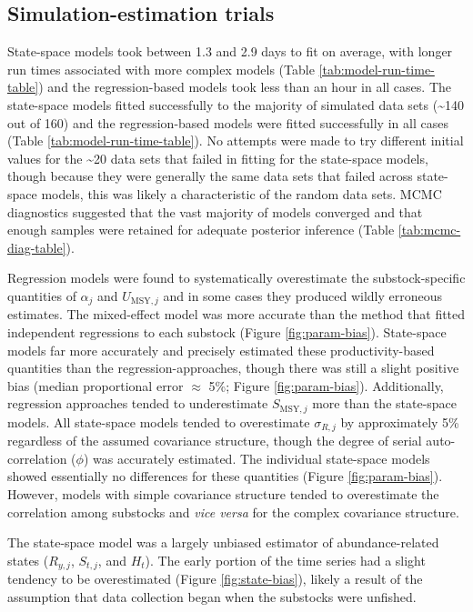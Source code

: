 \documentclass[12pt,]{book}
\theoremstyle{definition}
\theoremstyle{definition}
\theoremstyle{definition}
\theoremstyle{remark}
\begin{document}
\subsection{Simulation-estimation
trials}\label{simulation-estimation-trials-1}

\noindent
State-space models took between 1.3 and 2.9 days to fit on average, with
longer run times associated with more complex models (Table
\ref{tab:model-run-time-table}) and the regression-based models took
less than an hour in all cases. The state-space models fitted
successfully to the majority of simulated data sets
(\textasciitilde{}140 out of 160) and the regression-based models were
fitted successfully in all cases (Table \ref{tab:model-run-time-table}).
No attempts were made to try different initial values for the
\textasciitilde{}20 data sets that failed in fitting for the state-space
models, though because they were generally the same data sets that
failed across state-space models, this was likely a characteristic of
the random data sets. MCMC diagnostics suggested that the vast majority
of models converged and that enough samples were retained for adequate
posterior inference (Table \ref{tab:mcmc-diag-table}).

Regression models were found to systematically overestimate the
substock-specific quantities of \(\alpha_j\) and \(U_{\text{MSY},j}\)
and in some cases they produced wildly erroneous estimates. The
mixed-effect model was more accurate than the method that fitted
independent regressions to each substock (Figure \ref{fig:param-bias}).
State-space models far more accurately and precisely estimated these
productivity-based quantities than the regression-approaches, though
there was still a slight positive bias (median proportional error
\(\approx\) 5\%; Figure \ref{fig:param-bias}). Additionally, regression
approaches tended to underestimate \(S_{\text{MSY},j}\) more than the
state-space models. All state-space models tended to overestimate
\(\sigma_{R,j}\) by approximately 5\% regardless of the assumed
covariance structure, though the degree of serial auto-correlation
(\(\phi\)) was accurately estimated. The individual state-space models
showed essentially no differences for these quantities (Figure
\ref{fig:param-bias}). However, models with simple covariance structure
tended to overestimate the correlation among substocks and \emph{vice
versa} for the complex covariance structure.

The state-space model was a largely unbiased estimator of
abundance-related states (\(R_{y,j}\), \(S_{t,j}\), and \(H_t\)). The
early portion of the time series had a slight tendency to be
overestimated (Figure \ref{fig:state-bias}), likely a result of the
assumption that data collection began when the substocks were unfished.
\end{document}
